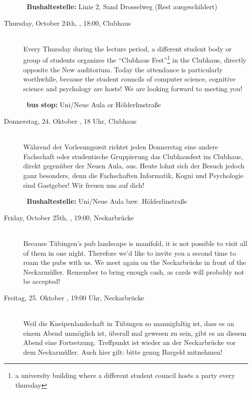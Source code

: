 \begin{description}
    ~\textbf{Bushaltestelle:} Linie 2, Sand Drosselweg (Rest ausgeschildert)
\fi

\ifml
    \item[Thursday, October 24th, \YEAR, 18:00, Clubhaus]\ \\
        Every Thursday during the lecture period, a different student body or group of students organizes the "`Clubhaus Fest"'\footnote{a university building where a different student council hosts a party every thursday} in the Clubhaus, directly opposite the New auditorium. Today the attendance is particularly worthwhile, because the student councils of computer science, cognitive science and psychology are hosts! We are looking forward to meeting you!

        ~\textbf{bus stop:} Uni/Neue Aula or Hölderlinstraße
\else
    \item[Donnerstag, 24. Oktober \YEAR, 18 Uhr, Clubhaus ]\ \\
        Während der Vorlesungszeit richtet jeden Donnerstag eine andere Fachschaft oder studentische Gruppierung das Clubhausfest im Clubhaus, direkt gegenüber der Neuen Aula, aus. Heute lohnt sich der Besuch jedoch ganz besonders, denn die Fachschaften Informatik, Kogni und Psychologie sind Gastgeber! Wir freuen uns auf dich!

~\textbf{Bushaltestelle:} Uni/Neue Aula bzw. Hölderlinstraße
\fi

\ifml
    \item[Friday, October 25th, \YEAR, 19:00, Neckarbrücke]\ \\
        Because Tübingen's pub landscape is manifold, it is not possible to visit all of them in one night. Therefore we'd like to invite you a second time to roam the pubs with us. We meet again on the Neckarbrücke in front of the Neckarmüller. Remember to bring enough cash, as cards will probably not be accepted!
\else
    \item[Freitag, 25. Oktober \YEAR, 19:00 Uhr, Neckarbrücke]\ \\
        Weil die Kneipenlandschaft in Tübingen so mannigfaltig ist, dass es an einem Abend unmöglich ist, überall mal gewesen zu sein, gibt es an diesem Abend eine Fortsetzung. Treffpunkt ist wieder an der Neckarbrücke vor dem Neckarmüller. Auch hier gilt: bitte genug Bargeld mitnehmen!
\fi


\end{description}
